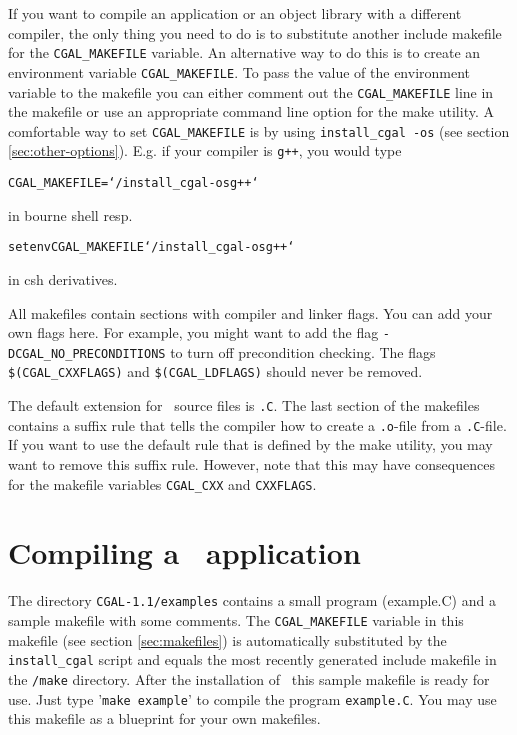 If you want to compile an application or an object library with a
different compiler, the only thing you need to do is to substitute
another include makefile for the \texttt{CGAL\_MAKEFILE} variable. An
alternative way to do this is to create an environment variable
\texttt{CGAL\_MAKEFILE}. To pass the value of the environment variable
to the makefile you can either comment out the \texttt{CGAL\_MAKEFILE}
line in the makefile or use an appropriate command line option for
the make utility.
A comfortable way to set \texttt{CGAL\_MAKEFILE} is by using
\texttt{install\_cgal~-os} (see section \ref{sec:other-options}).
E.g. if your compiler is \texttt{g++}, you would type
\begin{alltt}
CGAL_MAKEFILE=`\yourcgaldir/install_cgal -os g++`
\end{alltt}
in bourne shell resp.
\begin{alltt}
setenv CGAL_MAKEFILE `\yourcgaldir/install_cgal -os g++`
\end{alltt}
in csh derivatives.

All makefiles contain sections with compiler and linker
flags.  You can add your own flags here. For example, you might want
to add the flag \texttt{-DCGAL\_NO\_PRECONDITIONS} to turn off
precondition checking. The flags \texttt{\$(CGAL\_CXXFLAGS)} and
\texttt{\$(CGAL\_LDFLAGS)} should never be removed.

The default extension for \cgal\ source files is \texttt{.C}.  The
last section of the makefiles contains a suffix rule that tells the
compiler how to create a \texttt{.o}-file from a \texttt{.C}-file.  If
you want to use the default rule that is defined by the make utility,
you may want to remove this suffix rule.  However, note that this may
have consequences for the makefile variables \texttt{CGAL\_CXX} and
\texttt{CXXFLAGS}.

\section{Compiling a \cgal\ application}
The directory \texttt{CGAL-1.1/examples} contains a small program
(example.C) and a sample makefile with some comments. The
\texttt{CGAL\_MAKEFILE} variable in this makefile (see section
\ref{sec:makefiles}) is automatically substituted by the
\texttt{install\_cgal} script and equals the most recently generated
include makefile in the \texttt{\cgaldir/make} directory. After the
installation of \cgal\ this sample makefile is ready for use. Just
type '\texttt{make example}' to compile the program
\texttt{example.C}.  You may use this makefile as a blueprint for your
own makefiles.

